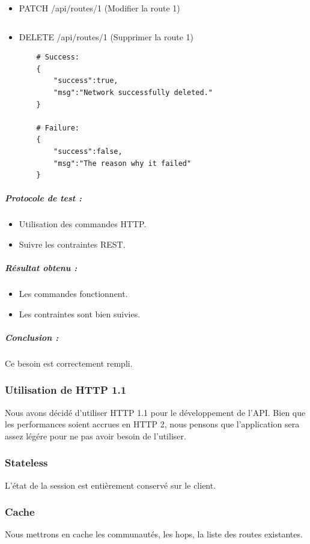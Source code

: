 \begin{itemize}
    \item PATCH /api/routes/1 (Modifier la route 1)
    \begin{verbatim}
    \end{verbatim}

    \item DELETE /api/routes/1 (Supprimer la route 1)
    \begin{verbatim}
    # Success:
    {
        "success":true,
        "msg":"Network successfully deleted."
    }

    # Failure:
    {
        "success":false,
        "msg":"The reason why it failed"
    }
    \end{verbatim}

\end{itemize}

\subparagraph{Protocole de test :}
\begin{itemize}
    \item Utilisation des commandes HTTP.
    \item Suivre les contraintes REST.
\end{itemize}
\subparagraph{Résultat obtenu :}
    \begin{itemize}
    \item Les commandes fonctionnent.
    \item Les contraintes sont bien suivies.
\end{itemize}
\subparagraph{Conclusion :}Ce besoin est correctement rempli.

\subsubsection{Utilisation de HTTP 1.1}
Nous avons décidé d'utiliser HTTP 1.1 pour le développement de l'API. Bien que les performances soient accrues en HTTP 2, nous pensons que l'application sera assez légére pour ne pas avoir besoin de l'utiliser.



\subsubsection{Stateless}
L’état de la session est entièrement conservé sur le client.

\subsubsection{Cache}
Nous mettrons en cache les communautés, les hops, la liste des routes existantes.

